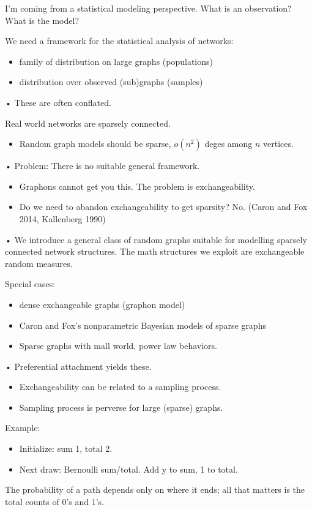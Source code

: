 I'm coming from a statistical modeling perspective. What is an observation? What is the model?

We need a framework for the statistical analysis of networks:
\begin{itemize}
\item
family of distribution on large graphs (populations)
\item
distribution over observed (sub)graphs (samples)
\end{itemize}•
These are often conflated.

Real world networks are sparsely connected. 
\begin{itemize}
\item
Random graph models should be sparse, $o(n^2)$ deges among $n$ vertices.
\end{itemize}•
Problem: 
There is no suitable general framework. 
\begin{itemize}
\item
Graphons cannot get you this. The problem is exchangeability.
\item
Do we need to abandon exchangeability to get sparsity? No. (Caron and Fox 2014, Kallenberg 1990)
\end{itemize}•
We introduce a general class of random graphs suitable for modelling sparsely connected network structures. The math structures we exploit are exchangeable random measures. 

Special cases:
\begin{itemize}
\item
dense exchangeable graphs (graphon model)
\item
Caron and Fox's nonparametric Bayesian models of sparse graphs
\item
Sparse graphs with mall world, power law behaviors.
\end{itemize}•
Preferential attachment yields these.

\begin{itemize}
\item
Exchangeability can be related to a sampling process.
\item
Sampling process is perverse for large (sparse) graphs.
\end{itemize}

Example: 
\begin{itemize}
\item
Initialize: sum 1, total 2.
\item
Next draw: Bernoulli sum/total. Add y to sum, 1 to total.
\end{itemize}
The probability of  a path depends only on where it ends; all that matters is the total counts of 0's and 1's.

